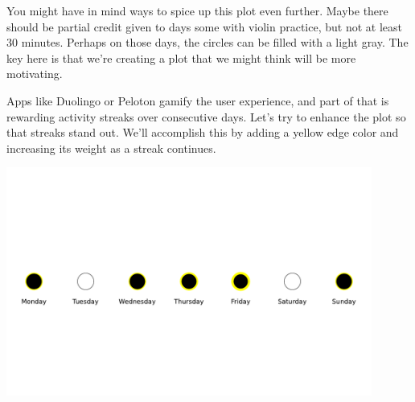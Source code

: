  You might have in mind ways to spice up this plot even further. Maybe there should be partial credit given to days some with violin practice, but not at least 30 minutes. Perhaps on those days, the circles can be filled with a light gray. The key here is that we're creating a plot that we might think will be more motivating. 
 
 Apps like Duolingo or Peloton gamify the user experience, and part of that is rewarding activity streaks over consecutive days. Let's try to enhance the plot so that streaks stand out. We'll accomplish this by adding a yellow edge color and increasing its weight as a streak continues.
 
 
 \begin{center}
     \includegraphics[width = 0.9\textwidth]{figures/poetryplots/violin-streak.pdf}
 \end{center}